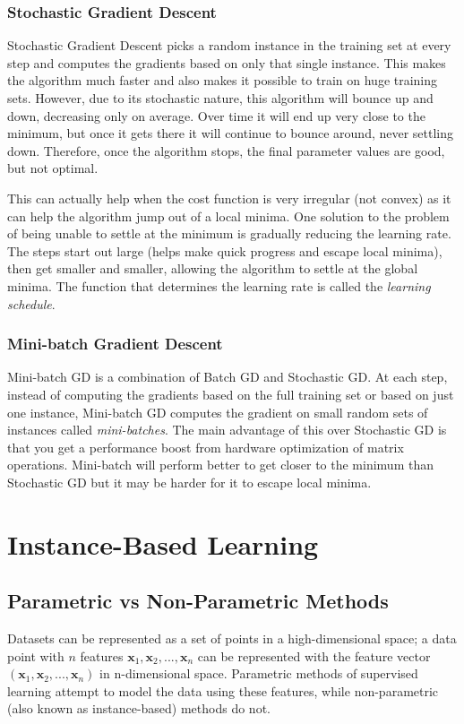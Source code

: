 \documentclass[12pt]{article}
\begin{document}
        \subsubsection{Stochastic Gradient Descent}
            Stochastic Gradient Descent picks a random instance in the training set at every step and computes the gradients based on only that single instance. This makes the algorithm much faster and also makes it possible to train on huge training sets.
            However, due to its stochastic nature, this algorithm will bounce up and down, decreasing only on average. Over time it will end up very close to the minimum, but once it gets there it will continue to bounce around, never settling down.
            Therefore, once the algorithm stops, the final parameter values are good, but not optimal.

            This can actually help when the cost function is very irregular (not convex) as it can help the algorithm jump out of a local minima. One solution to the problem of being unable to settle at the minimum 
            is gradually reducing the learning rate. The steps start out large (helps make quick progress and escape local minima), then get smaller and smaller, allowing the algorithm to settle at the global minima.
            The function that determines the learning rate is called the \textit{learning schedule}.
        
        \subsubsection{Mini-batch Gradient Descent}
            Mini-batch GD is a combination of Batch GD and Stochastic GD. At each step, instead of computing the gradients based on the full training set or based on just one instance, Mini-batch GD computes the gradient on small random sets of instances 
            called \textit{mini-batches}. The main advantage of this over Stochastic GD is that you get a performance boost from hardware optimization of matrix operations. Mini-batch will perform better to get closer to the minimum than Stochastic GD but it 
            may be harder for it to escape local minima.
    
\section{Instance-Based Learning}
    \subsection{Parametric vs Non-Parametric Methods}
        Datasets can be represented as a set of points in a high-dimensional space; a data point with $n$ features $\boldsymbol{x}_1, \boldsymbol{x}_2, ..., \boldsymbol{x}_n$ can be represented
        with the feature vector $(\boldsymbol{x}_1, \boldsymbol{x}_2, ..., \boldsymbol{x}_n)$ in n-dimensional space. Parametric methods of supervised learning attempt to model the data using
        these features, while non-parametric (also known as instance-based) methods do not.
\end{document}
